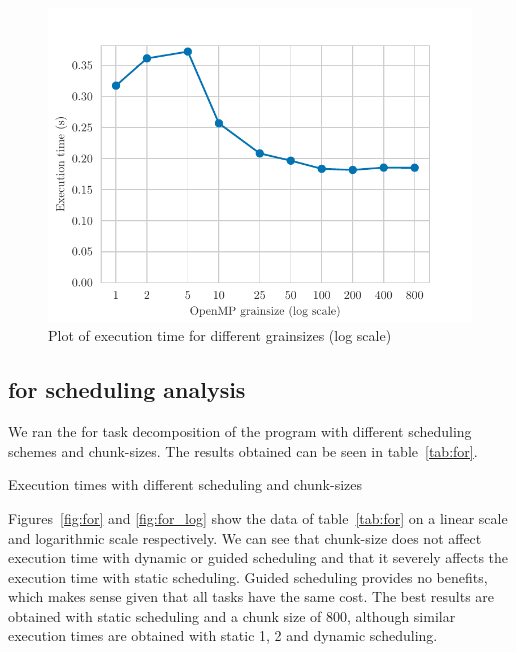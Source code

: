 \begin{figure}[H]
    \centering
    \includegraphics{plots/grainsize_log.pdf}
    \caption{Plot of execution time for different grainsizes (log scale)}
    \label{fig:grain_log} 
\end{figure}

\pagebreak
\subsection{for scheduling analysis}

We ran the for task decomposition of the program with different scheduling schemes and chunk-sizes. The
results obtained can be seen in table~\ref{tab:for}.

\begin{table}[H]
    \caption{Execution times with different scheduling and chunk-sizes}%
    \label{tab:for}
    \begin{center}
    
    \end{center}
\end{table}

Figures~\ref{fig:for} and \ref{fig:for_log} show the data of table~\ref{tab:for} on a linear scale and logarithmic
scale respectively. We can see that chunk-size does not affect execution time with dynamic or guided scheduling
and that it severely affects the execution time with static scheduling. Guided scheduling provides no benefits, which
makes sense given that all tasks have the same cost. The best results are obtained with static scheduling and
a chunk size of 800, although similar execution times are obtained with static 1, 2 and dynamic scheduling.


